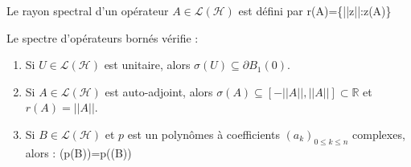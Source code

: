 \begin{Def}
Le rayon spectral d'un opérateur $A\in\mathcal L(\mathcal H)$ est défini par 
\beq
r(A)=\sup\{||z||:z\in\sigma(A)\}
\eeq
\end{Def}

\begin{The} Le spectre d'opérateurs bornés vérifie :
\begin{enumerate}
\item Si $U\in\mathcal L(\mathcal H)$ est unitaire, alors $\sigma(U)\subseteq \partial B_1(0)$.
\item Si $A\in\mathcal L(\mathcal H)$ est auto-adjoint, alors $\sigma(A)\subseteq [-||A||,||A||]\subset \mathbb R$ et $r(A)=||A||$.
\item Si $B\in\mathcal L(\mathcal H)$ et $p$ est un polynômes à coefficients $(a_k)_{0\leq k\leq n}$ complexes, alors :
\beq
\sigma(p(B))=p(\sigma(B))
\eeq
\end{enumerate}
\end{The}

